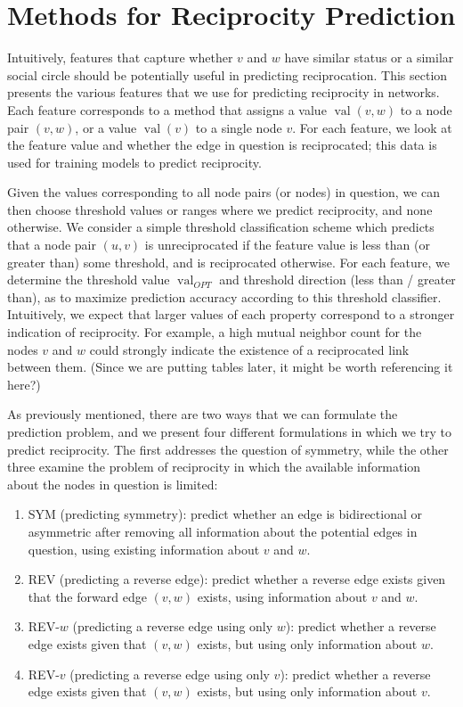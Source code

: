 \documentclass[conference]{IEEEtran}
\begin{document}
\section{Methods for Reciprocity Prediction}
Intuitively, features that capture whether $v$ and $w$ have similar status or a similar social circle should be potentially useful in predicting reciprocation. 
This section presents the various features that we use for predicting reciprocity in networks. 
Each feature corresponds to a method that assigns a value $\operatorname{val}(v,w)$ to a node pair $(v,w)$, or a value $\operatorname{val}(v)$ to a single node $v$. 
For each feature, we look at the feature value and whether the edge in question is reciprocated; this data is used for training models to predict reciprocity.

Given the values corresponding to all node pairs (or nodes) in question, we can then choose threshold values or ranges where we predict reciprocity, and none otherwise.
We consider a simple threshold classification scheme which predicts that a node pair $(u,v)$ is unreciprocated if the feature value is less than (or greater than) some threshold, and is reciprocated otherwise.
For each feature, we determine the threshold value $\operatorname{val}_{OPT}$ and threshold direction (less than / greater than), as to maximize prediction accuracy according to this threshold classifier.
Intuitively, we expect that larger values of each property correspond to a stronger indication of reciprocity. 
For example, a high mutual neighbor count for the nodes $v$ and $w$ could strongly indicate the existence of a reciprocated link between them.
(Since we are putting tables later, it might be worth referencing it here?)

As previously mentioned, there are two ways that we can formulate the prediction problem, and we present four different formulations in which we try to predict reciprocity. 
The first addresses the question of symmetry, while the other three examine the problem of reciprocity in which the available information about the nodes in question is limited:

\begin{enumerate}
\item SYM (predicting symmetry): predict whether an edge is bidirectional or asymmetric after removing all information about the potential edges in question, using existing information about $v$ and $w$.
\item REV (predicting a reverse edge): predict whether a reverse edge exists given that the forward edge $(v,w)$ exists, using information about $v$ and $w$.
\item REV-$w$ (predicting a reverse edge using only $w$): predict whether a reverse edge exists given that $(v,w)$ exists, but using only information about $w$.
\item REV-$v$ (predicting a reverse edge using only $v$): predict whether a reverse edge exists given that $(v,w)$ exists, but using only information about $v$.
\end{enumerate}
\end{document}

